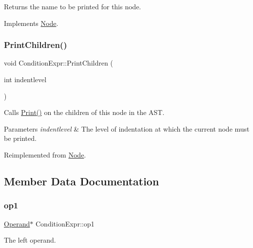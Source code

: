 Returns the name to be printed for this node. 

Implements \hyperlink{class_node_a56e29657306ffb004d69c6929ae44269}{Node}.

\mbox{\label{class_condition_expr_a6153d3269f792a6910b2a3f8ea79f406}} 
\subsubsection{\texorpdfstring{Print\+Children()}{PrintChildren()}}
{\footnotesize\ttfamily void Condition\+Expr\+::\+Print\+Children (\begin{DoxyParamCaption}\item[{int}]{indentlevel }\end{DoxyParamCaption})\hspace{0.3cm}{\ttfamily [virtual]}}

Calls \hyperlink{class_node_a9ef727fd72d1a37792b3db60a8a479dd}{Print()} on the children of this node in the A\+ST. 
\begin{DoxyParams}{Parameters}
{\em indentlevel} & The level of indentation at which the current node must be printed. \\
\hline
\end{DoxyParams}


Reimplemented from \hyperlink{class_node_a3e67ec8d22182b721717af14fe0c3000}{Node}.



\subsection{Member Data Documentation}
\mbox{\label{class_condition_expr_a04ae325c80ddf36a19ac98835f1ec2f5}} 
\subsubsection{\texorpdfstring{op1}{op1}}
{\footnotesize\ttfamily \hyperlink{class_operand}{Operand}$\ast$ Condition\+Expr\+::op1\hspace{0.3cm}{\ttfamily [protected]}}

The left operand. \mbox{\label{class_condition_expr_ad5729c5eb933845c2833be6a8da09e8a}} 
